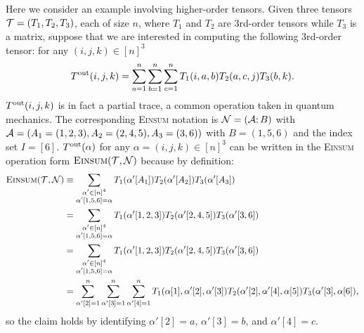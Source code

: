 \documentclass[letterpaper,11pt]{article}
\def\Einsum{\textsc{Einsum}}
\newcommand{\tensorcontraction}{\textsc{Einsum}}
\begin{document}
\begin{bibunit}[plainnat]
\begin{example}
\label{eg:tensor}
Here we consider an example involving higher-order tensors. Given three tensors ${\mathcal{T}} = (T_1, T_2, T_3)$, each of size $n$, where $T_1$ and $T_2$ are 3rd-order tensors while $T_3$ is a matrix, suppose that we are interested in computing the following 3rd-order tensor: for any $(i, j, k) \in [n]^{3}$
\begin{align*}
T^{\rm out} (i, j, k) = \sum_{a = 1}^{n} \sum_{b = 1}^{n} \sum_{c = 1}^{n} T_{1} (i, a, b) T_{2} (a, c, j) T_{3} (b, k).
\end{align*}
$T^{\rm out} (i, j, k)$ is in fact a partial trace, a common operation taken in quantum mechanics. The corresponding \Einsum{} notation is ${\mathcal{N}} = ({\mathcal{A}}; B)$ with ${\mathcal{A}} = (A_1 = (1, 2, 3), A_2 = (2, 4, 5), A_3 = (3, 6))$ with $B = (1, 5, 6)$ and the index set $I = [6]$. $T^{\rm out} (\alpha)$ for any $\alpha = (i, j, k) \in [n]^{3}$ can be written in the \Einsum{} operation form $\tensorcontraction(\calT, \calN)$ because by definition:
\begin{align*}
\tensorcontraction (\calT, \calN) & \equiv \sum_{\substack{\alpha' \in [n]^4 \\ \alpha' [1, 5, 6] = \alpha}} T_1 (\alpha' [A_1]) T_2 (\alpha' [A_2]) T_3 (\alpha' [A_3]) \\
& = \sum_{ \substack{\alpha' \in [n]^4 \\ \alpha' [1, 5, 6] = \alpha}} T_1 (\alpha' [1, 2, 3]) T_2 (\alpha' [2, 4, 5]) T_3 (\alpha' [3, 6]) \\
& = \sum_{\substack{\alpha' \in [n]^4 \\ \alpha' [1, 5, 6] = \alpha}} T_1 (\alpha' [1, 2, 3]) T_2 (\alpha' [2, 4, 5]) T_3 (\alpha' [3, 6]) \\
& = \sum_{\alpha' [2] = 1}^{n} \sum_{\alpha' [3] = 1}^{n} \sum_{\alpha' [4] = 1}^{n} T_{1} (\alpha [1], \alpha' [2], \alpha' [3]) T_{2} (\alpha' [2], \alpha' [4], \alpha [5]) T_{3} (\alpha' [3], \alpha [6]),
\end{align*}
so the claim holds by identifying $\alpha' [2] = a$, $\alpha' [3] = b$, and $\alpha' [4] = c$.
\end{example}


\end{bibunit}
\end{document}
